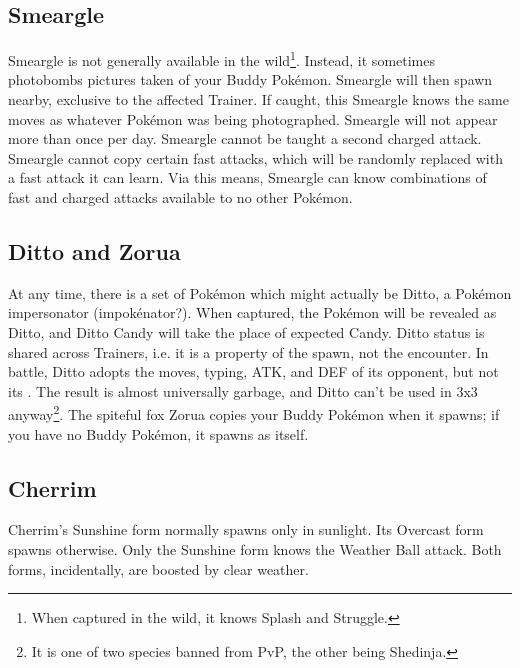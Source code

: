 \subsection{Smeargle\label{subsec:smeargle}}
Smeargle is not generally available in the wild\footnote{When captured in the wild, it knows Splash and Struggle.}.
Instead, it sometimes photobombs pictures taken of your Buddy Pokémon.
Smeargle will then spawn nearby, exclusive to the affected Trainer.
If caught, this Smeargle knows the same moves as whatever Pokémon was being photographed.
Smeargle will not appear more than once per day.
Smeargle cannot be taught a second charged attack.
Smeargle cannot copy certain fast attacks, which will be randomly replaced with
 a fast attack it can learn.
Via this means, Smeargle can know combinations of fast and charged attacks available
 to no other Pokémon.

\subsection{Ditto and Zorua\label{subsec:ditto}}
At any time, there is a set of Pokémon which might actually be Ditto,
  a Pokémon impersonator (impokénator?).
When captured, the Pokémon will be revealed as Ditto, and Ditto Candy will take
  the place of expected Candy.
Ditto status is shared across Trainers, i.e. it is a property of the spawn, not the encounter.
In battle, Ditto adopts the moves, typing, ATK, and DEF of its opponent, but not its \MHP\@.
The result is almost universally garbage, and Ditto can't be used in 3x3 anyway\footnote{It is one of two species banned from PvP, the other being Shedinja.}.
The spiteful fox Zorua copies your Buddy Pokémon when it spawns; if you have no Buddy
  Pokémon, it spawns as itself.

\subsection{Cherrim}
Cherrim's Sunshine form normally spawns only in sunlight.
Its Overcast form spawns otherwise.
Only the Sunshine form knows the Weather Ball attack.
Both forms, incidentally, are boosted by clear weather.


